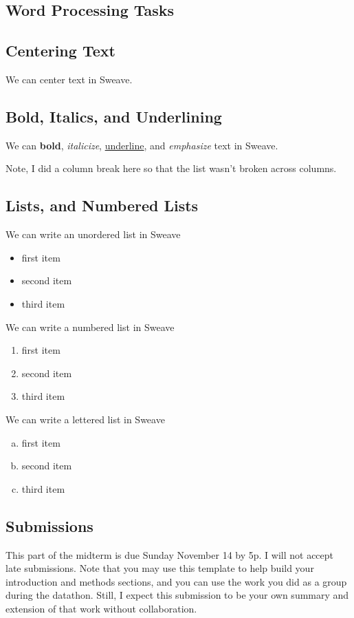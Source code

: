 \documentclass{article}\usepackage[]{graphicx}\usepackage[]{xcolor}
\begin{document}
\begin{multicols}{2}
\section{Word Processing Tasks}

\subsection{Centering Text}
\begin{center}
We can center text in Sweave.
\end{center} 

\subsection{Bold, Italics, and Underlining}
We can \textbf{bold}, \textit{italicize}, \underline{underline}, and \emph{emphasize} text in Sweave.

Note, I did a column break here so that the list wasn't broken across columns.\columnbreak 

\subsection{Lists, and Numbered Lists}
We can write an unordered list in Sweave
\begin{itemize}\itemsep0em
\item first item
\item second item
\item third item
\end{itemize}
We can write a numbered list in Sweave
\begin{enumerate}[1.]\itemsep0em
\item first item
\item second item
\item third item
\end{enumerate}
We can write a lettered list in Sweave
\begin{enumerate}[a.]\itemsep0em
\item first item
\item second item
\item third item
\end{enumerate}

\subsection{Submissions}
This part of the midterm is due Sunday November 14 by 5p. I will not accept late submissions. Note that you may use this template to help build your introduction and methods sections, and you can use the work you did as a group during the datathon. Still, I expect this submission to be your own summary and extension of that work without collaboration.


\end{multicols}
\end{document}
